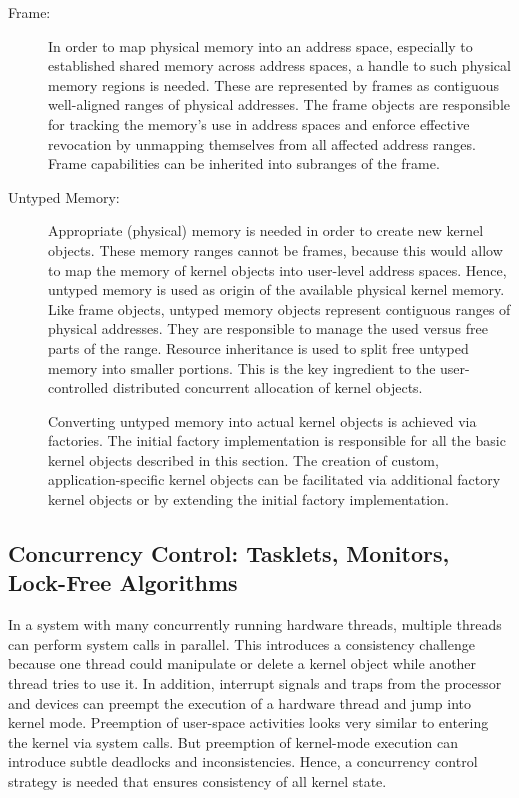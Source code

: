 \begin{description}
\item[Frame:] In order to map physical memory into an address space, especially to established shared memory across address spaces, a handle to such physical memory regions is needed. These are represented by frames as contiguous well-aligned ranges of physical addresses. The frame objects are responsible for tracking the memory's use in address spaces and enforce effective revocation by unmapping themselves from all affected address ranges. Frame capabilities can be inherited into subranges of the frame.

\item[Untyped Memory:]
Appropriate (physical) memory is needed in order to create new kernel objects. These memory ranges cannot be frames, because this would allow to map the memory of kernel objects into user-level address spaces. Hence, untyped memory is used as origin of the available physical kernel memory. Like frame objects, untyped memory objects represent contiguous ranges of physical addresses. They are responsible to manage the used versus free parts of the range. Resource inheritance is used to split free untyped memory into smaller portions. This is the key ingredient to the user-controlled distributed concurrent allocation of kernel objects. 

Converting untyped memory into actual kernel objects is achieved via factories. The initial factory implementation is responsible for all the basic kernel objects described in this section. The creation of custom, application-specific kernel objects can be facilitated via additional factory kernel objects or by extending the initial factory implementation.
\end{description}

\subsection{Concurrency Control: Tasklets, Monitors, Lock-Free Algorithms}
\label{sec:concurrency_control}

In a system with many concurrently running hardware threads, multiple threads can perform system calls in parallel. This introduces a consistency challenge because one thread could manipulate or delete a kernel object while another thread tries to use it. 
In addition, interrupt signals and traps from the processor and devices can preempt the execution of a hardware thread and jump into kernel mode. Preemption of user-space activities looks very similar to entering the kernel via system calls. But preemption of kernel-mode execution can introduce subtle deadlocks and inconsistencies. 
Hence, a concurrency control strategy is needed that ensures consistency of all kernel state.

